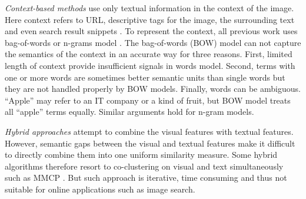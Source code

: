{\em Context-based methods} use only
textual information in the context of the image.
Here context refers to URL, descriptive tags for the image,
the surrounding text and even search result snippets \cite{Jing2006}.
To represent the context, all previous work uses bag-of-words or
n-grams model \cite{Jing2006}.
The bag-of-words (BOW) model can not capture the semantics of the context
in an accurate way for three reasons.
First, limited length of context provide insufficient signals
in words model. Second, terms with one or more words 
are sometimes better semantic units than single words but they are not
handled properly by BOW models.
Finally, words can be ambiguous. ``Apple'' may refer
to an IT company or a kind of fruit, but BOW model treats all ``apple''
terms equally.
Similar arguments hold for n-gram models.

{\em Hybrid approaches} attempt to combine the visual features
with textual features.
However, semantic gaps between the visual and textual features
make it difficult to directly combine them into one uniform similarity measure.
Some hybrid algorithms therefore resort to co-clustering on
visual and text simultaneously such as MMCP \cite{Fu2011}.
But such approach is iterative, time consuming and
thus not suitable for online applications such as image search.

